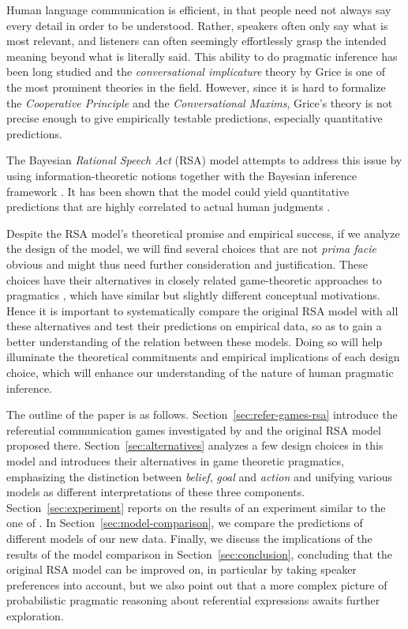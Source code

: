 Human language communication is efficient, in that people need not
always say every detail in order to be understood. Rather, speakers
often only say what is most relevant, and listeners can often
seemingly effortlessly grasp the intended meaning beyond what is
literally said. This ability to do pragmatic inference has been long
studied and the \emph{conversational implicature} theory by Grice
\cite{Grice} is one of the most prominent theories in the
field. However, since it is hard to formalize the \emph{Cooperative
  Principle} and the \emph{Conversational Maxims}, Grice's theory is
not precise enough to give empirically testable predictions,
especially quantitative predictions.

The Bayesian \emph{Rational Speech Act} (RSA) model attempts to
address this issue by using information-theoretic notions together
with the Bayesian inference framework
\cite{Frank2009,Frank,Bergen2012,GoodmanStuhlmuller2013:Knowledge-and-I}. It
has been shown that the model could yield quantitative predictions
that are highly correlated to actual human judgments
\cite{Frank,GoodmanStuhlmuller2013:Knowledge-and-I}.

Despite the RSA model's theoretical promise and empirical success, if
we analyze the design of the model, we will find several choices that
are not \emph{prima facie} obvious and might thus need further
consideration and justification. These choices have their alternatives
in closely related game-theoretic approaches to pragmatics
\cite{Rabin1990:Communication-b,Stalnaker:SayingMeaningCredibility,BenzvanRooijOptimalAssertions2007,Franke2011:Quantity-Implic,Jager2013:Rationalizable-}, which have similar but slightly
different conceptual motivations. Hence it is important to
systematically compare the original RSA model with all these
alternatives and test their predictions on empirical data, so as to
gain a better understanding of the relation between these
models. Doing so will help illuminate the theoretical commitments and
empirical implications of each design choice, which will enhance our
understanding of the nature of human pragmatic inference.

The outline of the paper is as
follows. Section~\ref{sec:refer-games-rsa} introduce the referential
communication games investigated by \cite{Frank} and the original RSA
model proposed there. Section~\ref{sec:alternatives} analyzes a few
design choices in this model and introduces their alternatives in game
theoretic pragmatics, emphasizing the distinction between
\emph{belief}, \emph{goal} and \emph{action} and unifying various
models as different interpretations of these three
components. Section~\ref{sec:experiment} reports on the results of an
experiment similar to the one of \cite{Frank}. In
Section~\ref{sec:model-comparison}, we compare the predictions of
different models of our new data. Finally, we discuss the implications
of the results of the model comparison in
Section~\ref{sec:conclusion}, concluding that the original RSA model
can be improved on, in particular by taking speaker preferences into
account, but we also point out that a more complex picture of
probabilistic pragmatic reasoning about referential expressions awaits
further exploration.


